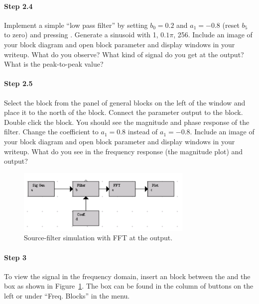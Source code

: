 \paragraph{Step 2.4} Implement a simple ``low pass filter'' by setting
$b_0=0.2$ and $a_1=-0.8$ (reset $b_5$ to zero) and pressing
.  Generate a sinusoid with  1,
 $0.1\pi$,  256. Include an
image of your block diagram and open block parameter and display
windows in your writeup. What do you observe?  What kind of signal do
you get at the output? What is the peak-to-peak value?


\paragraph{Step 2.5} Select the  block from the panel
of general blocks on the left of the window and place it to the north
of the  block. Connect the parameter output to the
 block. Double click the  block. You
should see the magnitude and phase response of the filter. Change the
coefficient to $a_1 = 0.8$ instead of $a_1 = -0.8$. Include an image
of your block diagram and open block parameter and display windows in
your writeup. What do you see in the frequency response (the magnitude
plot) and output?


\begin{figure}
\begin{center}
\includegraphics[width=0.75\textwidth]{lab1/image023}
\end{center}
\caption{Source-filter simulation with FFT at the output.\label{fg:sim}}
\end{figure}

\paragraph{Step 3} To view the signal in the frequency domain, insert
an  block between the  and the 
box as shown in Figure~\ref{fg:sim}. The  box can be found
in the column of buttons on the left or under ``Freq. Blocks'' in the
 menu.

